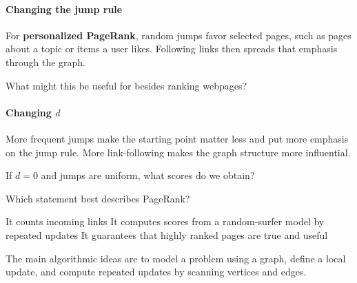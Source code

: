 \documentclass[11pt]{article}
\begin{document}
\paragraph{Changing the jump rule}
For \textbf{personalized PageRank}, random jumps favor selected pages, such
as pages about a topic or items a user likes. Following links then spreads
that emphasis through the graph.

What might this be useful for besides ranking webpages?
\vs{.7cm}

\paragraph{Changing $d$}
More frequent jumps make the starting point matter less and put more emphasis
on the jump rule. More link-following makes the graph structure more influential.

If $d=0$ and jumps are uniform, what scores do we obtain?
\vs{.6cm}

\begin{Qu}
    Which statement best describes PageRank?
    \begin{itemize}
        \aitem It counts incoming links
        \bitem It computes scores from a random-surfer model by repeated updates
        \citem It guarantees that highly ranked pages are true and useful
    \end{itemize}
\end{Qu}

\vfill
The main algorithmic ideas are to model a problem using a graph, define a
local update, and compute repeated updates by scanning vertices and edges.
\end{document}

